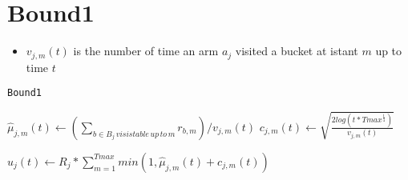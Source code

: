 \section{Bound1}
\begin{itemize}
	\item $v_{j,m}(t)$ is the number of time an arm $a_j$ visited a bucket at istant $m$ up to time $t$
	
\end{itemize}
\begin{algorithm}[!h]
	\caption{\texttt{Bound1}}
	\begin{scriptsize}
		\begin{algorithmic}[1]
			
			
	
			
				
				\State$\hat{\mu}_{j,m}(t)  \gets (\sum_{b \in B_j\, visistable\, up \,to\, m}{}{r_{b,m}})/ v_{j,m}(t)$\;
				\State$c_{j,m}(t)\gets  \sqrt{\frac{2log(t*Tmax^{\frac{1}{4}})}{v_{j,m}(t)}}$\;
			
			\EndFor		
			
			\State $u_j(t) \gets  R_j *\sum_{m=1}^{Tmax} min(1,\hat{\mu}_{j,m}(t)+c_{j,m}(t)) $\;	
			\EndFor
			
	
			
			
			\EndFunction
			
		\end{algorithmic}
	\end{scriptsize}
	\label{alg:Bound1}
\end{algorithm}

\fi
